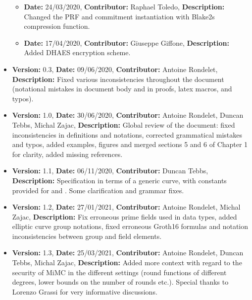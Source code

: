 \begin{itemize}
\begin{itemize}
            \item \textbf{Date:} 24/03/2020, \textbf{Contributor:} Raphael Toledo, \textbf{Description:} Changed the PRF and commitment instantiation with Blake2s compression function.
            \item \textbf{Date:} 17/04/2020, \textbf{Contributor:} Giuseppe Giffone, \textbf{Description:} Added DHAES encryption scheme.
        \end{itemize}
    \item \textbf{Version:} 0.3, \textbf{Date:} 09/06/2020, \textbf{Contributor:} Antoine Rondelet, \textbf{Description:} Fixed various inconsistencies throughout the document (notational mistakes in document body and in proofs, latex macros, and typos).
    \item \textbf{Version:} 1.0, \textbf{Date:} 30/06/2020, \textbf{Contributor:} Antoine Rondelet, Duncan Tebbs, Michal Zajac, \textbf{Description:} Global review of the document: fixed inconsistencies in definitions and notations, corrected grammatical mistakes and typos, added examples, figures and merged sections 5 and 6 of Chapter 1 for clarity, added missing references.
    \item \textbf{Version:} 1.1, \textbf{Date:} 06/11/2020, \textbf{Contributor:} Duncan Tebbs, \textbf{Description:} Specification in terms of a generic curve, with constants provided for \BNCurve and \BLSCurve. Some clarification and grammar fixes.
    \item \textbf{Version:} 1.2, \textbf{Date:} 27/01/2021, \textbf{Contributor:} Antoine Rondelet, Michal Zajac, \textbf{Description:} Fix erroneous prime fields used in data types, added elliptic curve group notations, fixed erroneous Groth16 formulas and notation inconsistencies between group and field elements.
    \item \textbf{Version:} 1.3, \textbf{Date:} 25/03/2021, \textbf{Contributor:} Antoine Rondelet, Duncan Tebbs, Michal Zajac, \textbf{Description:} Added more context with regard to the security of MiMC in the different settings (round functions of different degrees, lower bounds on the number of rounds etc.). Special thanks to Lorenzo Grassi for very informative discussions.
\end{itemize}
